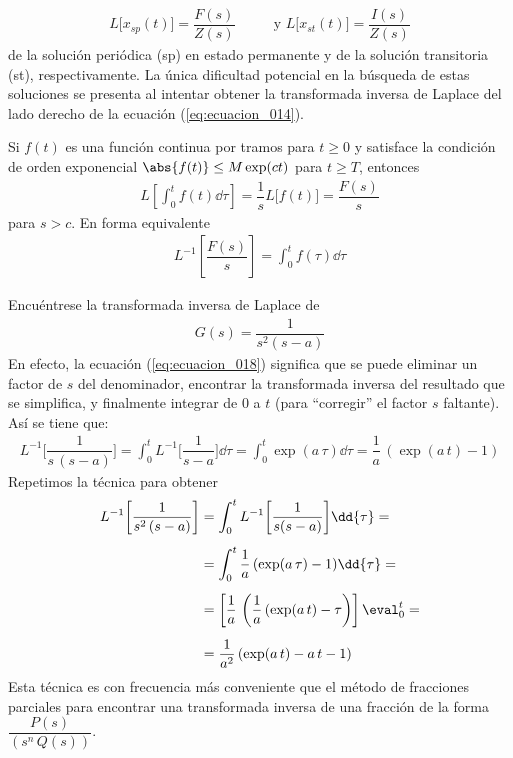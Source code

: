 \begin{align*}
L \big[x_{sp} (t)\big] = \dfrac{F(s)}{Z(s)} \hspace{1cm} \mbox{ y } L \big[x_{st} (t)\big] = \dfrac{I(s)}{Z(s)}
\end{align*}
de la solución periódica (sp) en estado permanente y de la solución transitoria (st), respectivamente. La única dificultad potencial en la búsqueda de estas soluciones se presenta al intentar obtener la transformada inversa de Laplace del lado derecho de la ecuación (\ref{eq:ecuacion_014}). 
\begin{teo}
Si $f(t)$ es una función continua por tramos para $t \geq 0$ y satisface la condición de orden exponencial $\abs{f(t)} \leq M \exp(c t)$ para $t \geq T $, entonces
\begin{align}
L \left[ \int_{0}^{t} f(t) \dd{\tau} \right] = \dfrac{1}{s} L \big[f(t) \big] = \dfrac{F(s)}{s}
\label{eq:ecuacion_017}
\end{align}
para $s > c$. En forma equivalente 
\begin{align}
L^{-1} \left[ \dfrac{F(s)}{s} \right] = \int_{0}^{t} f(\tau) \dd{\tau}
\label{eq:ecuacion_018}
\end{align}
\end{teo}
\begin{ejemplo}
Encuéntrese la transformada inversa de Laplace de
\begin{align*}
G(s) = \dfrac{1}{s^{2} (s - a)}
\end{align*}
En efecto, la ecuación (\ref{eq:ecuacion_018}) significa que se puede eliminar un factor de $s$ del denominador, encontrar la transformada inversa del resultado que se simplifica, y finalmente integrar de $0$ a $t$ (para \enquote{corregir} el factor $s$ faltante). Así se tiene que:
\begin{align*}
L^{-1} \bigg[ \dfrac{1}{s \, (s - a)} \bigg] = \int_{0}^{t} L^{-1} \bigg[\dfrac{1}{s - a} \bigg] \dd{\tau}  = \int_{0}^{t} \exp(a \, \tau) \dd{\tau} = \dfrac{1}{a} \, (\exp(a \, t) - 1)
\end{align*}
Repetimos la técnica para obtener
\begin{align*}
L^{-1} \bigg[\dfrac{1}{s^{2} \, (s - a)} \bigg] &= \int_{0}^{t} L^{-1} \bigg[\dfrac{1}{s(s-a)} \bigg] \dd{\tau} = \\[0.5em]
&= \int_{0}^{t} \dfrac{1}{a} \, (\exp(a \, \tau) - 1) \dd{\tau} = \\[0.5em]
&= \left[ \dfrac{1}{a} \, \left( \dfrac{1}{a} \, (\exp(a \, t) - \tau \right) \right] \eval_{0}^{t} = \\[0.5em]
&= \dfrac{1}{a^{2}} \, ( \exp(a \, t) - a \, t - 1)
\end{align*}
Esta técnica es con frecuencia más conveniente que el método de fracciones parciales para encontrar una transformada inversa de una fracción de la forma $\dfrac{P(s)}{(s^{n} \, Q(s))}$.
\end{ejemplo}

